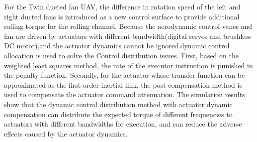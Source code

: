\begin{abstractEN}
For the Twin ducted fan UAV, the difference in rotation speed of the left and right ducted fans is introduced as a new control surface to provide additional rolling torque for the rolling channel. Because the aerodynamic control vanes and fan are driven by actuators with different bandwidth(digital servos and brushless DC motor),and the actuator dynamics cannot be ignored.dynamic control allocation is used to solve the Control distribution issues. First, based on the weighted least squares method, the rate of the executor instruction is punished in the penalty function. Secondly, for the actuator whose transfer function can be approximated as the first-order inertial link, the post-compensation method is used to compensate the actuator command attenuation. The simulation results show that the dynamic control distribution method with actuator dynamic compensation can distribute the expected torque of different frequencies to actuators with different bandwidths for execution, and can reduce the adverse effects caused by the actuator dynamics.
\end{abstractEN}

